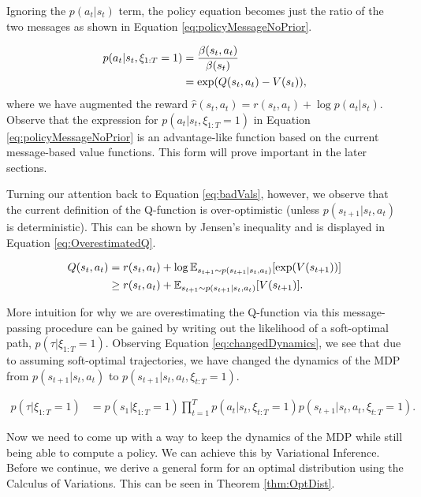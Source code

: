 \documentclass{report}
\numberwithin{equation}{section}
\numberwithin{figure}{section}
\numberwithin{table}{section}
\numberwithin{algorithm}{section}
\begin{document}
Ignoring the $p(a_t|s_t)$ term, 
the policy equation becomes just the ratio 
of the two messages as shown in Equation \ref{eq:policyMessageNoPrior}.

\begin{align}\label{eq:policyMessageNoPrior}
  p(a_t|s_t, \xi_{1:T}=1)&=\frac{\beta(s_t, a_t)}{\beta(s_t)}\notag\\
  &=\exp(Q(s_t, a_t) - V(s_t)),
\end{align}
where we have augmented the reward $\hat{r}(s_t, a_t)=r(s_t,a_t) + \log p(a_t|s_t)$.
Observe that the expression for $p(a_t|s_t,\xi_{1:T}=1)$ in Equation 
\ref{eq:policyMessageNoPrior} is an advantage-like function based on 
the current message-based value functions. This form will prove 
important in the later sections.

Turning our attention back to Equation \ref{eq:badVals}, however, 
we observe that the current definition of the Q-function is 
over-optimistic (unless $p(s_{t+1}|s_t,a_t)$ is deterministic). 
This can be shown by Jensen's inequality and 
is displayed in Equation \ref{eq:OverestimatedQ}.

\begin{align}\label{eq:OverestimatedQ}
  Q(s_t,a_t)&=r(s_t, a_t) + \log\mathbb{E}_{s_{t+1}\sim p(s_{t+1}|s_t, a_t)}[\exp (V(s_{t+1}))]\notag\\
  &\ge r(s_t, a_t) + \mathbb{E}_{s_{t+1}\sim p(s_{t+1}|s_t, a_t)}[V(s_{t+1})].
\end{align}

More intuition for why we are overestimating the Q-function 
via this message-passing procedure can be gained by writing 
out the likelihood of a soft-optimal path, $p(\tau|\xi_{1:T}=1)$. 
Observing Equation \ref{eq:changedDynamics}, we see that due to 
assuming soft-optimal trajectories, we have changed the dynamics 
of the MDP from $p(s_{t+1}|s_t, a_t)$ to 
$p(s_{t+1}| s_t,a_t,\xi_{t:T}=1)$.

\begin{align}\label{eq:changedDynamics}
  p(\tau|\xi_{1:T}=1)&=p(s_1|\xi_{1:T}=1)\prod_{t=1}^Tp(a_t|s_t,\xi_{t:T}=1)p(s_{t+1}|s_t, a_t, \xi_{t:T}=1).
\end{align}

Now we need to come up with a way to keep the dynamics of the MDP 
while still being able to compute a policy. 
We can achieve this by Variational Inference. Before we continue, 
we derive a general form for an optimal distribution using 
the Calculus of Variations. This can be seen in Theorem \ref{thm:OptDist}.
\end{document}

